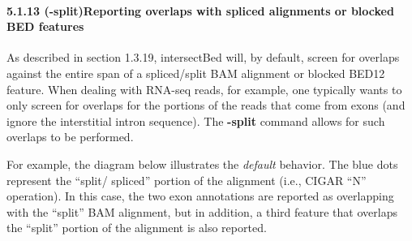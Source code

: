 \documentclass[letterpaper,10pt,english]{sphinxmanual}
\begin{document}
\paragraph{5.1.13 (-split)Reporting overlaps with spliced alignments or blocked BED features}
\label{content/intersectBed:split-reporting-overlaps-with-spliced-alignments-or-blocked-bed-features}
As described in section 1.3.19, intersectBed will, by default, screen for overlaps against the entire span
of a spliced/split BAM alignment or blocked BED12 feature. When dealing with RNA-seq reads, for
example, one typically wants to only screen for overlaps for the portions of the reads that come from
exons (and ignore the interstitial intron sequence). The \textbf{-split} command allows for such overlaps to be
performed.

For example, the diagram below illustrates the \emph{default} behavior. The blue dots represent the ``split/
spliced'' portion of the alignment (i.e., CIGAR ``N'' operation). In this case, the two exon annotations
are reported as overlapping with the ``split'' BAM alignment, but in addition, a third feature that
overlaps the ``split'' portion of the alignment is also reported.
\end{document}
